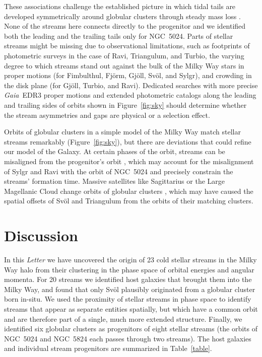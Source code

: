 \documentclass[twocolumn]{aastex63}
\newcommand{\gaia}{\textsl{Gaia}}
\begin{document}
These associations challenge the established picture in which tidal tails are developed symmetrically around globular clusters through steady mass loss \citep[e.g.,][]{kuepper2010}.
None of the streams here connects directly to the progenitor and we identified both the leading and the trailing tails only for NGC~5024.
Parts of stellar streams might be missing due to observational limitations, such as footprints of photometric surveys in the case of Ravi, Triangulum, and Turbio, the varying degree to which streams stand out against the bulk of the Milky Way stars in proper motions (for Fimbulthul, Fj\" orm, Gj\" oll, Sv\" ol, and Sylgr), and crowding in the disk plane (for Gj\" oll, Turbio, and Ravi).
Dedicated searches with more precise \gaia\ EDR3 proper motions \citep{gaiaedr3} and extended photometric catalogs \citep{dey2019} along the leading and trailing sides of orbits shown in Figure~\ref{fig:sky} should determine whether the stream asymmetries and gaps are physical or a selection effect.

Orbits of globular clusters in a simple model of the Milky Way match stellar streams remarkably (Figure~\ref{fig:sky}), but there are deviations that could refine our model of the Galaxy.
At certain phases of the orbit, streams can be misaligned from the progenitor's orbit \citep{sanders2013}, which may account for the misalignment of Sylgr and Ravi with the orbit of NGC~5024 and precisely constrain the streams' formation time.
Massive satellites like Sagittarius or the Large Magellanic Cloud change orbits of globular clusters \citep{garrow2020}, which may have caused the spatial offsets of Sv\" ol and Triangulum from the orbits of their matching clusters.


\section{Discussion}
\label{sec:discussion}

In this {\it Letter} we have uncovered the origin of 23 cold stellar streams in the Milky Way halo from their clustering in the phase space of orbital energies and angular momenta.
For 20 streams we identified host galaxies that brought them into the Milky Way, and found that only Sv\" ol plausibly originated from a globular cluster born in-situ.
We used the proximity of stellar streams in phase space to identify streams that appear as separate entities spatially, but which have a common orbit and are therefore part of a single, much more extended structure.
Finally, we identified six globular clusters as progenitors of eight stellar streams (the orbits of NGC~5024 and NGC~5824 each passes through two streams).
The host galaxies and individual stream progenitors are summarized in Table~\ref{table}.
\end{document}
